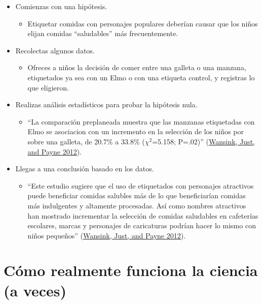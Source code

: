 \documentclass[
  12pt,
]{book}
\providecommand{\tightlist}{%
  \setlength{\itemsep}{0pt}\setlength{\parskip}{0pt}}
\begin{document}
\begin{itemize}
\tightlist
\item
  Comienzas con una hipótesis.

  \begin{itemize}
  \tightlist
  \item
    Etiquetar comidas con personajes populares deberían causar que los niños elijan comidas ``saludables'' más frecuentemente.
  \end{itemize}
\item
  Recolectas algunos datos.

  \begin{itemize}
  \tightlist
  \item
    Ofreces a niños la decisión de comer entre una galleta o una manzana, etiquetados ya sea con un Elmo o con una etiqueta control, y registras lo que eligieron.
  \end{itemize}
\item
  Realizas análisis estadísticos para probar la hipótesis nula.

  \begin{itemize}
  \tightlist
  \item
    ``La comparación preplaneada muestra que las manzanas etiquetadas con Elmo se asociacion con un incremento en la selección de los niños por sobre una galleta, de 20.7\% a 33.8\% (\(\chi^2\)=5.158; P=.02)'' (\protect\hyperlink{ref-wans:just:payn:2012}{Wansink, Just, and Payne 2012}).
  \end{itemize}
\item
  Llegas a una conclusión basado en los datos.

  \begin{itemize}
  \tightlist
  \item
    ``Este estudio sugiere que el uso de etiquetados con personajes atractivos puede beneficiar comidas salubles más de lo que beneficiarían comidas más indulgentes y altamente procesadas. Así como nombres atractivos han mostrado incrementar la selección de comidas saludables en cafeterías escolares, marcas y personajes de caricaturas podrían hacer lo mismo con niños pequeños'' (\protect\hyperlink{ref-wans:just:payn:2012}{Wansink, Just, and Payne 2012}).
  \end{itemize}
\end{itemize}

\hypertarget{cuxf3mo-realmente-funciona-la-ciencia-a-veces}{%
\section{Cómo realmente funciona la ciencia (a veces)}\label{cuxf3mo-realmente-funciona-la-ciencia-a-veces}}
\end{document}
